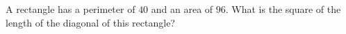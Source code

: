 A rectangle has a perimeter of $40$ and an area of $96$. What is the square of the length of the diagonal of this rectangle?

